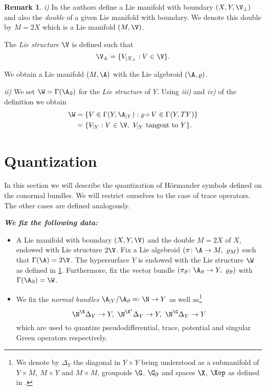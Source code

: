 \documentclass[10pt, reqno]{amsart}
\theoremstyle{definition}
\newtheorem{Rem}[Thm]{Remark}
\begin{document}
\begin{Rem}
\emph{i)} In \cite{AIN} the authors define a Lie manifold with boundary $(X, Y, \V_{\pm})$ and also the \emph{double} of a given Lie manifold with boundary.
We denote this double by $M = 2X$ which is a Lie manifold $(M, \V)$.

The \emph{Lie structure} $\V$ is defined such that
\[
\V_{\pm} = \{V_{|X_{\pm}} : V \in \V\}.
\]

We obtain a Lie manifold $(M, \A)$ with the Lie algebroid $(\A, \varrho)$. 

\emph{ii)} We set $\W = \Gamma(\A_{\partial})$ for the \emph{Lie structure} of $Y$. Using \emph{iii)} and \emph{iv)}
of the definition we obtain
\begin{align*}
\W &= \{V \in \Gamma(Y, \A_{|Y}) : \varrho \circ V \in \Gamma(Y, TY)\} \\
&= \{V_{|Y} : V \in \V, \ V_{|Y} \ \text{tangent to} \ Y\}. 
\end{align*}

\label{Rem:double}
\end{Rem}

\section{Quantization}

In this section we will describe the quantization of H\"ormander symbols defined on the conormal bundles.
We will restrict ourselves to the case of trace operators. The other cases are defined analogously.

\textbf{\emph{We fix the following data:}} 
\begin{itemize}
\item A Lie manifold with boundary $(X, Y, \V)$ and the double $M = 2X$ of $X$, endowed with Lie structure $2 \V$. Fix a Lie algebroid $(\pi \colon \A \to M, \ \varrho_M)$ such that $\Gamma(\A) = 2\V$. The hypersurface $Y$ is endowed with the Lie structure $\W$ as defined in \ref{Rem:double}.
Furthermore, fix the vector bundle $(\pi_{\partial} \colon \A_{\partial} \to Y, \ \varrho_{\partial})$ with $\Gamma(\A_{\partial}) = \W$.  

\item We fix the \emph{normal bundles} $\A_{|Y} / \A_{\partial} =: \N \to Y$ as well as\footnote{We denote by $\Delta_Y$ the diagonal in $Y \times Y$ being understood as a submanifold of $Y \times M, \ M \times Y$ and $M \times M$, groupoids $\G$, $\G_{\partial}$ and spaces $\X$, $\Xop$ as defined in \cite{B2}.}
\[
\N^{\X} \Delta_Y \to Y, \ \N^{\X^t} \Delta_Y \to Y, \ \N^{\G} \Delta_Y \to Y
\]
which are used to quantize pseudodifferential, trace, potential and singular Green operators respectively. 
\end{itemize}
\end{document}

